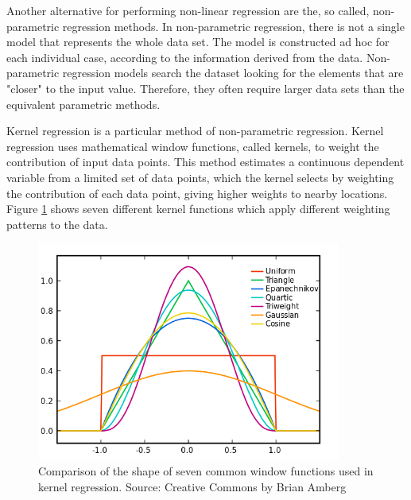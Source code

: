 Another alternative for performing non-linear regression are the, so called, non-parametric regression methods. In non-parametric regression, there is not a single model that represents the whole data set. The model is constructed ad hoc for each individual case, according to the information derived from the data. Non-parametric regression models search the dataset looking for the elements that are "closer" to the input value. Therefore, they often require larger data sets than the equivalent parametric methods. 

\medskip

Kernel regression is a particular method of non-parametric regression. Kernel regression uses mathematical window functions, called kernels, to weight the contribution of input data points. This method estimates a continuous dependent variable from a limited set of data points, which the kernel selects by weighting the contribution of each data point, giving higher weights to nearby locations. Figure \ref{kernel_shapes} shows seven different kernel functions which apply different weighting patterns to the data.

\medskip

\begin{figure}[h]
 \centerline{\includegraphics[width=10cm]{kernel_shapes.png}} \caption{Comparison of the shape of seven common window functions used in kernel regression. Source: Creative Commons by Brian Amberg}\label{kernel_shapes}
\end{figure}

\bigskip
\bigskip


